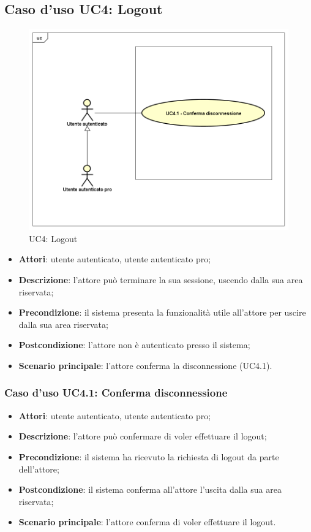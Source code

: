 \newpage
\subsection{Caso d'uso UC4: Logout}
	\label{UC4}
	\begin{figure}[h]
		\centering
			\includegraphics[scale=0.5,keepaspectratio]{UML/UC4.png}
		\caption{UC4: Logout}
	\end{figure}
	\FloatBarrier
	\begin{itemize}
		\item
			\textbf{Attori}: utente autenticato, utente autenticato pro;
		\item		
			\textbf{Descrizione}: l'attore può terminare la sua sessione, uscendo dalla sua area riservata;
		\item
			\textbf{Precondizione}: il sistema presenta la funzionalità utile all'attore per uscire dalla sua area riservata;
		\item
			\textbf{Postcondizione}: l'attore non è autenticato presso il sistema;
		\item
			\textbf{Scenario principale}: l'attore conferma la disconnessione (UC4.1).
	\end{itemize}

\subsubsection{Caso d'uso UC4.1: Conferma disconnessione}
	\begin{itemize}
		\item
			\textbf{Attori}: utente autenticato, utente autenticato pro;
		\item
			\textbf{Descrizione}: l'attore può confermare di voler effettuare il logout;
 		\item
			\textbf{Precondizione}: il sistema ha ricevuto la richiesta di logout da parte dell'attore;
		\item
			\textbf{Postcondizione}: il sistema conferma all'attore l'uscita dalla sua area riservata;
		\item
			\textbf{Scenario principale}: l'attore conferma di voler effettuare il logout.
	\end{itemize}		
	
